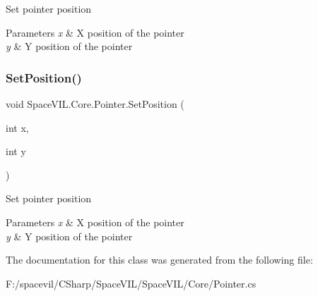 Set pointer position 


\begin{DoxyParams}{Parameters}
{\em x} & X position of the pointer \\
\hline
{\em y} & Y position of the pointer \\
\hline
\end{DoxyParams}
\mbox{\label{class_space_v_i_l_1_1_core_1_1_pointer_a22add8b2868fcbf998e5b65b264e4761}} 
\subsubsection{\texorpdfstring{Set\+Position()}{SetPosition()}\hspace{0.1cm}{\footnotesize\ttfamily [2/2]}}
{\footnotesize\ttfamily void Space\+V\+I\+L.\+Core.\+Pointer.\+Set\+Position (\begin{DoxyParamCaption}\item[{int}]{x,  }\item[{int}]{y }\end{DoxyParamCaption})\hspace{0.3cm}{\ttfamily [inline]}}



Set pointer position 


\begin{DoxyParams}{Parameters}
{\em x} & X position of the pointer \\
\hline
{\em y} & Y position of the pointer \\
\hline
\end{DoxyParams}


The documentation for this class was generated from the following file\+:\begin{DoxyCompactItemize}
\item 
F\+:/spacevil/\+C\+Sharp/\+Space\+V\+I\+L/\+Space\+V\+I\+L/\+Core/Pointer.\+cs\end{DoxyCompactItemize}
